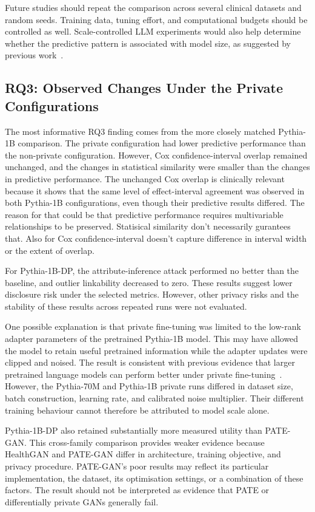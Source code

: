 Future studies should repeat the comparison across several clinical
datasets and random seeds. Training data, tuning effort, and
computational budgets should be controlled as well.
Scale-controlled LLM experiments would also help determine whether the
predictive pattern is associated with model size, as suggested by
previous work~\cite{Miletic2024}.

\subsection{RQ3: Observed Changes Under the Private Configurations}

The most informative RQ3 finding comes from the more closely matched
Pythia-1B comparison. The private configuration had lower predictive
performance than the non-private configuration. However, Cox
confidence-interval overlap remained unchanged, and the changes in
statistical similarity were smaller than the changes in predictive
performance. The unchanged Cox overlap is clinically relevant because it
shows that the same level of effect-interval agreement was observed in
both Pythia-1B configurations, even though their predictive results
differed. The reason for that could be that predictive performance 
requires multivariable relationships to be preserved. Statisical 
similarity don't necessarily gurantees that. Also for Cox
confidence-interval doesn't capture difference in interval width or 
the extent of overlap. 

For Pythia-1B-DP, the attribute-inference attack performed no better than
the baseline, and outlier linkability decreased to zero. These results
suggest lower disclosure risk under the selected metrics. However, other
privacy risks and the stability of these results across repeated runs were
not evaluated.

One possible explanation is that private fine-tuning was limited to the
low-rank adapter parameters of the pretrained Pythia-1B model. This may
have allowed the model to retain useful pretrained information while the
adapter updates were clipped and noised. The result is consistent with
previous evidence that larger pretrained language models can perform
better under private fine-tuning~\cite{Li2022LargeDP}. However, the
Pythia-70M and Pythia-1B private runs differed in dataset size, batch
construction, learning rate, and calibrated noise multiplier. Their
different training behaviour cannot therefore be attributed to model
scale alone.

Pythia-1B-DP also retained substantially more measured utility than
PATE-GAN. This cross-family comparison provides weaker evidence because
HealthGAN and PATE-GAN differ in architecture, training objective, and
privacy procedure. PATE-GAN's poor results may reflect its particular
implementation, the dataset, its optimisation settings, or a combination
of these factors. The result should not be interpreted as evidence that
PATE or differentially private GANs generally fail.

